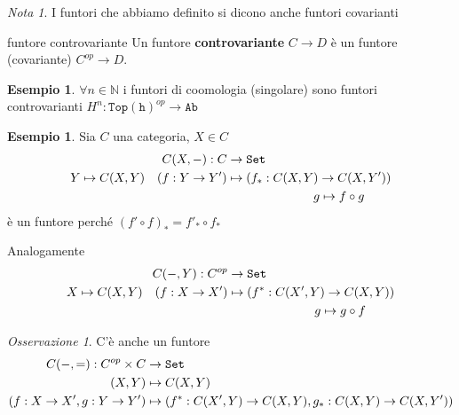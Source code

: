 \documentclass[notitlepage]{report}
\newcounter{theo}[section]\setcounter{theo}{0}
\newcounter{excounter}[section]\setcounter{excounter}{0}
\numberwithin{equation}{section}
\theoremstyle{plain}
\theoremstyle{definition}
\newtheorem{example}[excounter]{Esempio}
\theoremstyle{remark}
\newtheorem*{note}{Nota}
\newtheorem*{remark}{Osservazione}
\begin{document}
\begin{note}{}
    I funtori che abbiamo definito si dicono anche funtori covarianti
\end{note}
\begin{definition}{funtore controvariante}
    Un funtore \textbf{controvariante} \(C \to D\) è un funtore (covariante) \(C^{op} \to D\).
\end{definition}
\begin{example}{}
    \(\forall n \in \mathbb{N}\) i funtori di coomologia (singolare) sono funtori
    controvarianti \(H^{n} : \mathtt{Top(h)}^{op} \to \mathtt{Ab}\) 
\end{example}
\begin{example}{}
    Sia \(C\) una categoria, \(X \in C\)
    \begin{align*}
        C{(X, \--)} : C &\to \mathtt{Set} \\
        Y \mapsto C{(X, Y)} \quad {(f : Y \to Y')} &\mapsto {(f_{*} : C{(X, Y)} \to C{(X, Y')})} \\
            & \quad \quad \quad \quad\quad\quad\quad  g \mapsto f \circ g
    \end{align*}
    è un funtore perché \({(f' \circ f)}_* = f'_* \circ f_*\) 

    Analogamente 
    \begin{align*}
        C{(\--, Y)} : C^{op} &\to \mathtt{Set} \\
        X \mapsto C{(X, Y)} \quad {(f : X \to X')} &\mapsto {(f^{*} : C{(X', Y)} \to C{(X, Y)})} \\
            & \quad \quad \quad \quad\quad\quad\quad  g \mapsto g \circ f
    \end{align*}
\end{example}
\begin{remark}{}
    C'è anche un funtore 
    \begin{align*}
        C{(\--, =)} : C^{op} \times C &\to \mathtt{Set} \\
        {(X, Y)} &\mapsto C{(X, Y)} \\
        {(f : X \to X', g : Y \to Y')} &\mapsto {(f^* : C{(X', Y)} \to  C{(X,Y)}, g_* : C{(X, Y)} \to C{(X, Y')})}
    \end{align*}
\end{remark}
\end{document}

